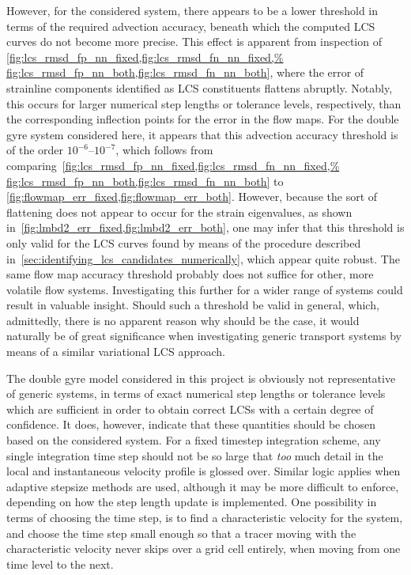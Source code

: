 However, for the considered system, there appears to be a lower threshold
in terms of the required advection accuracy, beneath which the computed LCS
curves do not become more precise. This effect is apparent
from inspection of
\cref{fig:lcs_rmsd_fp_nn_fixed,fig:lcs_rmsd_fn_nn_fixed,%
fig:lcs_rmsd_fp_nn_both,fig:lcs_rmsd_fn_nn_both}, where the error of strainline
components identified as LCS constituents flattens abruptly. Notably, this
occurs for larger numerical step lengths or tolerance levels, respectively,
than the corresponding inflection points for the error in the flow maps.
For the double gyre system considered here, it appears that this advection
accuracy threshold is of the order $10^{-6}$--$10^{-7}$, which follows from
comparing~\cref{fig:lcs_rmsd_fp_nn_fixed,fig:lcs_rmsd_fn_nn_fixed,%
fig:lcs_rmsd_fp_nn_both,fig:lcs_rmsd_fn_nn_both} to
\cref{fig:flowmap_err_fixed,fig:flowmap_err_both}. However, because the
sort of flattening does not appear to occur for the strain eigenvalues,
as shown in~\cref{fig:lmbd2_err_fixed,fig:lmbd2_err_both}, one may infer
that this threshold is only valid for the LCS curves found by means of the
procedure described in~\cref{sec:identifying_lcs_candidates_numerically}, which
appear quite robust. The same flow map accuracy threshold probably does not
suffice for other, more volatile flow systems. Investigating
this further for a wider range of systems could result in valuable insight.
Should such a threshold be valid in general, which, admittedly, there is
no apparent reason why should be the case, it would naturally be of great
significance when investigating generic transport systems by means of a
similar variational LCS approach.

The double gyre model considered in this project is obviously not representative
of generic systems, in terms of exact numerical step lengths or tolerance
levels which are sufficient in order to obtain correct LCSs with a certain
degree of confidence. It does, however, indicate that these quantities should
be chosen based on the considered system. For a fixed timestep integration
scheme, any single integration time step should not be so large that \emph{too}
much detail in the local and instantaneous velocity profile is glossed over.
Similar logic applies when adaptive stepsize methods are used, although it
may be more difficult to enforce, depending on how the step length
update is implemented. One possibility in terms of choosing the time step, is to
find a characteristic velocity for the system, and choose the time step small
enough so that a tracer moving with the characteristic velocity never skips over
a grid cell entirely, when moving from one time level to the next.

